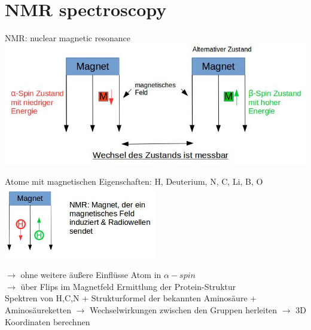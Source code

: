 \section{NMR spectroscopy}
NMR: nuclear magnetic resonance\\
\includegraphics[width=1\textwidth]{lectures/160603/pix/3.jpg}

Atome mit magnetischen Eigenschaften: H, Deuterium, N, C, Li, B, O\\
\includegraphics[width=0.5\textwidth]{lectures/160603/pix/4.jpg}

$\rightarrow$ ohne weitere äußere Einflüsse Atom in $\alpha-spin$\\
$\rightarrow$ über Flips im Magnetfeld Ermittlung der Protein-Struktur\\

Spektren von H,C,N + Strukturformel der bekannten Aminosäure + Aminosäureketten $\rightarrow$ Wechselwirkungen zwischen den Gruppen herleiten $\rightarrow$ 3D Koordinaten berechnen